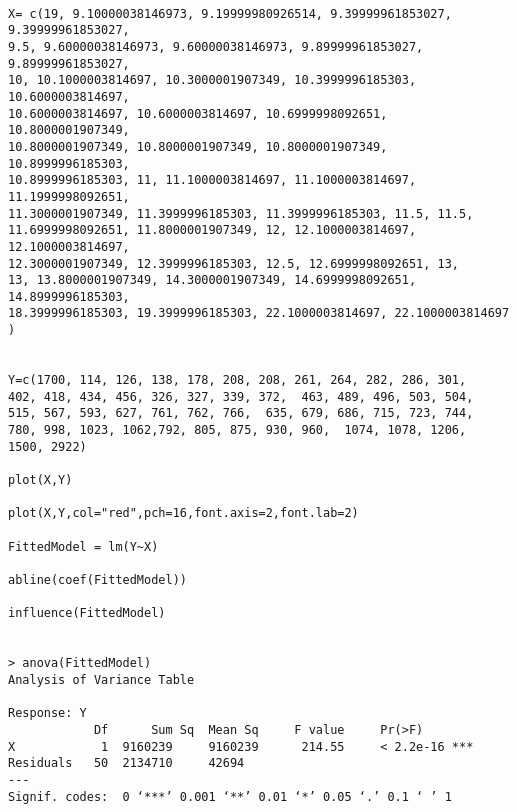 \documentclass[a4paper,12pt]{article}
\begin{document}
\begin{verbatim}

X= c(19, 9.10000038146973, 9.19999980926514, 9.39999961853027, 9.39999961853027, 
9.5, 9.60000038146973, 9.60000038146973, 9.89999961853027, 9.89999961853027, 
10, 10.1000003814697, 10.3000001907349, 10.3999996185303, 10.6000003814697, 
10.6000003814697, 10.6000003814697, 10.6999998092651, 10.8000001907349, 
10.8000001907349, 10.8000001907349, 10.8000001907349, 10.8999996185303, 
10.8999996185303, 11, 11.1000003814697, 11.1000003814697, 11.1999998092651, 
11.3000001907349, 11.3999996185303, 11.3999996185303, 11.5, 11.5, 
11.6999998092651, 11.8000001907349, 12, 12.1000003814697, 12.1000003814697, 
12.3000001907349, 12.3999996185303, 12.5, 12.6999998092651, 13, 
13, 13.8000001907349, 14.3000001907349, 14.6999998092651, 14.8999996185303, 
18.3999996185303, 19.3999996185303, 22.1000003814697, 22.1000003814697
)


Y=c(1700, 114, 126, 138, 178, 208, 208, 261, 264, 282, 286, 301, 
402, 418, 434, 456, 326, 327, 339, 372,  463, 489, 496, 503, 504, 
515, 567, 593, 627, 761, 762, 766,  635, 679, 686, 715, 723, 744, 
780, 998, 1023, 1062,792, 805, 875, 930, 960,  1074, 1078, 1206, 
1500, 2922)

plot(X,Y)

plot(X,Y,col="red",pch=16,font.axis=2,font.lab=2)

FittedModel = lm(Y~X)

abline(coef(FittedModel))

influence(FittedModel)


> anova(FittedModel)
Analysis of Variance Table

Response: Y
          	Df  	Sum Sq 	Mean Sq 	F value    	Pr(>F)    
X         	 1 	9160239 	9160239 	 214.55 	< 2.2e-16 ***
Residuals 	50 	2134710   	42694                      
---
Signif. codes:  0 ‘***’ 0.001 ‘**’ 0.01 ‘*’ 0.05 ‘.’ 0.1 ‘ ’ 1 
\end{verbatim}
\end{document}
